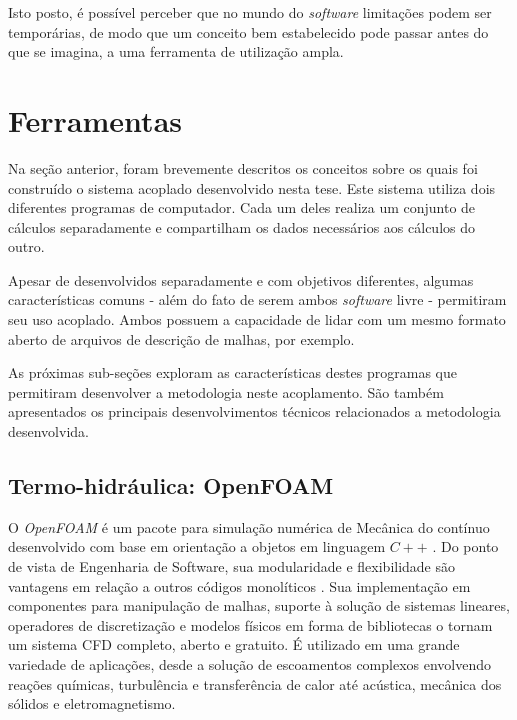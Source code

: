 Isto posto, é possível perceber que no mundo do \textit{software} limitações podem ser temporárias, de modo que um
conceito bem estabelecido pode passar antes do que se imagina, a uma ferramenta de utilização ampla.

\section{Ferramentas}
\label{sec:ferr}

Na seção anterior, foram brevemente descritos os conceitos sobre os quais foi construído
o sistema acoplado desenvolvido nesta tese. Este
sistema utiliza dois diferentes programas de computador. Cada um deles
realiza um conjunto de cálculos separadamente e compartilham os dados necessários aos cálculos do outro.

Apesar de desenvolvidos separadamente e com objetivos diferentes, algumas características comuns - além
do fato de serem ambos \textit{software} livre - permitiram seu uso acoplado. Ambos possuem a capacidade de lidar
com um mesmo formato aberto de arquivos de descrição de malhas, por exemplo.


As próximas sub-seções exploram as características destes programas que permitiram desenvolver
a metodologia neste acoplamento. São também apresentados os principais desenvolvimentos técnicos
relacionados a metodologia desenvolvida.

\subsection{Termo-hidráulica: \textbf{OpenFOAM}}
\label{subsection:openfoam}

O \textit{OpenFOAM} é um pacote para simulação numérica de Mecânica
do contínuo desenvolvido com base em orientação a objetos em linguagem $C++$ .
Do ponto de vista de Engenharia de Software, sua modularidade e flexibilidade são vantagens
em relação a outros códigos monolíticos  \cite{Jasak2007}. Sua implementação em componentes para manipulação de malhas, suporte
à solução de sistemas lineares, operadores de discretização e modelos físicos em forma de bibliotecas o tornam
um sistema CFD completo, aberto e gratuito. É utilizado em uma grande variedade
de aplicações, desde a solução de escoamentos complexos envolvendo reações químicas, turbulência e
transferência de calor até acústica, mecânica dos sólidos e eletromagnetismo. 

